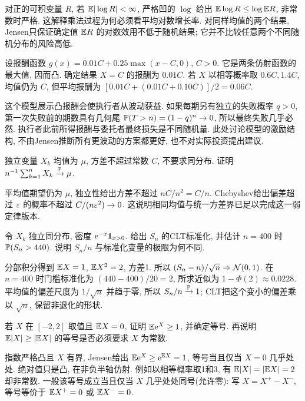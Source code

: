 \begin{example}
对正的可积变量 $R$, 若 $\mathbb E|\log R|<\infty$, 严格凹的 $\log$ 给出
$\mathbb E\log R\leq\log\mathbb E R$, 非常数时严格. 这解释乘法过程为何必须看平均对数增长率. 对同样均值的两个结果, Jensen只保证确定值 $\mathbb E R$ 的对数效用不低于随机结果; 它并不比较任意两个不同随机分布的风险高低.
\end{example}
\begin{example}
设报酬函数 $g(x)=0.01C+0.25\max(x-C,0)$, $C>0$. 它是两条仿射函数的最大值, 因而凸. 确定结果 $X=C$ 的报酬为 $0.01C$. 若 $X$ 以相等概率取 $0.6C,1.4C$, 均值仍为 $C$, 但平均报酬为
\mbox{$[0.01C+(0.01C+0.10C)]/2=0.06C$}.

这个模型展示凸报酬会使执行者从波动获益. 如果每期另有独立的失败概率 $q>0$, 第一次失败前的期数具有几何尾 $\mathbb P(T>n)=(1-q)^n\to0$, 所以最终失败几乎必然. 执行者此前所得报酬与委托者最终损失是不同随机量. 此处讨论模型的激励结构, 不由Jensen推断所有更波动的方案都更好, 也不对实际投资提出建议.
\end{example}

\begin{exercise}
独立变量 $X_k$ 均值为 $\mu$, 方差不超过常数 $C$, 不要求同分布. 证明 $n^{-1}\sum_{k=1}^nX_k\xrightarrow{\mathbb P}\mu$.
\end{exercise}
\begin{solution}
平均值期望仍为 $\mu$, 独立性给出方差不超过 $nC/n^2=C/n$. Chebyshev给出偏差超过 $\varepsilon$ 的概率不超过 $C/(n\varepsilon^2)\to0$. 这说明相同均值与统一方差界已足以完成这一弱定律版本.
\end{solution}
\begin{exercise}
令 $X_k$ 独立同分布, 密度 $\mathrm e^{-x}\mathbf 1_{x>0}$. 给出 $S_n$ 的CLT标准化, 并估计 $n=400$ 时 $\mathbb P(S_n>440)$. 说明 $S_n/n$ 与标准化变量的极限为何不同.
\end{exercise}
\begin{solution}
分部积分得到 $\mathbb E X=1$, $\mathbb E X^2=2$, 方差1. 所以 $(S_n-n)/\sqrt n\Rightarrow\mathcal N(0,1)$. 在 $n=400$ 时门槛标准化为 $(440-400)/20=2$, 所求近似为 $1-\Phi(2)\approx0.0228$. 平均值的偏差尺度为 $1/\sqrt n$ 并趋于零, 所以 $S_n/n\xrightarrow{\mathbb P}1$; CLT把这个变小的偏差乘以 $\sqrt n$, 保留非退化的形状.
\end{solution}
\begin{exercise}
若 $X$ 在 $[-2,2]$ 取值且 $\mathbb E X=0$, 证明 $\mathbb E\mathrm e^X\geq1$, 并确定等号. 再说明 $\mathbb E|X|\geq|\mathbb E X|$ 的等号是否必须要求 $X$ 为常数.
\end{exercise}
\begin{solution}
指数严格凸且 $X$ 有界, Jensen给出 $\mathbb E\mathrm e^X\geq\mathrm e^{\mathbb E X}=1$, 等号当且仅当 $X=0$ 几乎处处. 绝对值只是凸, 在非负半轴仿射. 例如以相等概率取1和3, 有 $\mathbb E|X|=|\mathbb E X|=2$ 却非常数. 一般该等号成立当且仅当 $X$ 几乎处处同号(允许零): 写 $X=X^+-X^-$, 等号等价于 $\mathbb E X^+=0$ 或 $\mathbb E X^-=0$.
\end{solution}
